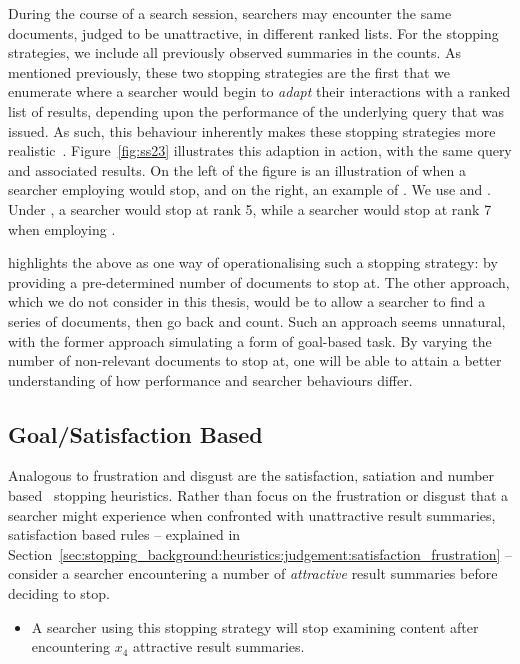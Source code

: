 During the course of a search session, searchers may encounter the same documents, judged to be unattractive, in different ranked lists. For the stopping strategies, we include all previously observed summaries in the counts. As mentioned previously, these two stopping strategies are the first that we enumerate where a searcher would begin to \emph{adapt} their interactions with a ranked list of results, depending upon the performance of the underlying query that was issued. As such, this behaviour inherently makes these stopping strategies more realistic~\cite{moffat2013users_versus_models}. Figure~\ref{fig:ss23} illustrates this adaption in action, with the same query and associated results. On the left of the figure is an illustration of when a searcher employing  would stop, and on the right, an example of . We use  and . Under , a searcher would stop at rank 5, while a searcher would stop at rank 7 when employing .

\cite{cooper1973retrieval_effectiveness_ii} highlights the above as one way of operationalising such a stopping strategy: by providing a pre-determined number of documents to stop at. The other approach, which we do not consider in this thesis, would be to allow a searcher to find a series of documents, then go back and count. Such an approach seems unnatural, with the former approach simulating a form of goal-based task. By varying the number of non-relevant documents to stop at, one will be able to attain a better understanding of how performance and searcher behaviours differ.

\subsection{Goal/Satisfaction Based}
Analogous to frustration and disgust are the satisfaction, satiation and number based~\citep{simon1955satiation, gibbs1958number_rule} stopping heuristics. Rather than focus on the frustration or disgust that a searcher might experience when confronted with unattractive result summaries, satisfaction based rules -- explained in Section~\ref{sec:stopping_background:heuristics:judgement:satisfaction_frustration} -- consider a searcher encountering a number of \emph{attractive} result summaries before deciding to stop.

\begin{itemize}
    \item{ A searcher using this stopping strategy will stop examining content after encountering $x_4$ attractive result summaries.}
\end{itemize}

